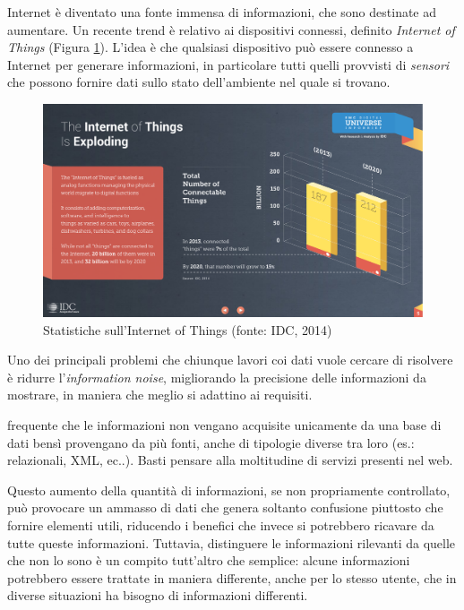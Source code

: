 Internet è diventato una fonte immensa di informazioni, che sono destinate ad aumentare. Un recente trend è relativo ai dispositivi connessi, definito \emph{Internet of Things} (Figura \ref{fig:statistiche-iot}). L'idea è che qualsiasi dispositivo può essere connesso a Internet per generare informazioni, in particolare tutti quelli provvisti di \emph{sensori} che possono fornire dati sullo stato dell'ambiente nel quale si trovano.

\begin{figure}[ht]
	\centering
	\includegraphics[width=\textwidth]{1-introduzione/Immagini/iot-trend.pdf}
	\caption[Statistiche sull'Internet of Things]{Statistiche sull'Internet of Things (fonte: IDC, 2014)\label{fig:statistiche-iot}}
\end{figure}

Uno dei principali problemi che chiunque lavori coi dati vuole cercare di risolvere è ridurre l'\emph{information noise}, migliorando la precisione delle informazioni da mostrare, in maniera che meglio si adattino ai requisiti.

\upe frequente che le informazioni non vengano acquisite unicamente da una base di dati bensì provengano da più fonti, anche di tipologie diverse tra loro (es.: relazionali, XML, ec..). Basti pensare alla moltitudine di servizi presenti nel web.

Questo aumento della quantità di informazioni, se non propriamente controllato, può provocare un ammasso di dati che genera soltanto confusione piuttosto che fornire elementi utili, riducendo i benefici che invece si potrebbero ricavare da tutte queste informazioni. Tuttavia, distinguere le informazioni rilevanti da quelle che non lo sono è un compito tutt'altro che semplice: alcune informazioni potrebbero essere trattate in maniera differente, anche per lo stesso utente, che in diverse situazioni ha bisogno di informazioni differenti. 

